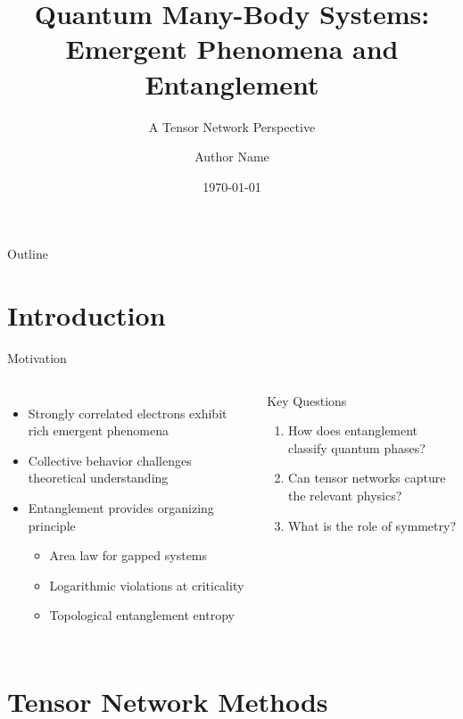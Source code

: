 \documentclass[aspectratio=169]{beamer}
\title{Quantum Many-Body Systems:\\Emergent Phenomena and Entanglement}
\subtitle{A Tensor Network Perspective}
\author{Author Name}
\institute{Department of Physics\\University of Example}
\date{\today}
\begin{document}
\begin{frame}
  \titlepage
\end{frame}

\begin{frame}{Outline}
  \tableofcontents
\end{frame}

\section{Introduction}

\begin{frame}{Motivation}
  \begin{columns}
    \begin{itemize}
      \item Strongly correlated electrons exhibit rich emergent phenomena
      \item Collective behavior challenges theoretical understanding
      \item Entanglement provides organizing principle
      \begin{itemize}
        \item Area law for gapped systems
        \item Logarithmic violations at criticality
        \item Topological entanglement entropy
      \end{itemize}
    \end{itemize}

    \begin{block}{Key Questions}
      \begin{enumerate}
        \item How does entanglement classify quantum phases?
        \item Can tensor networks capture the relevant physics?
        \item What is the role of symmetry?
      \end{enumerate}
    \end{block}
  \end{columns}
\end{frame}

\section{Tensor Network Methods}
\end{document}

